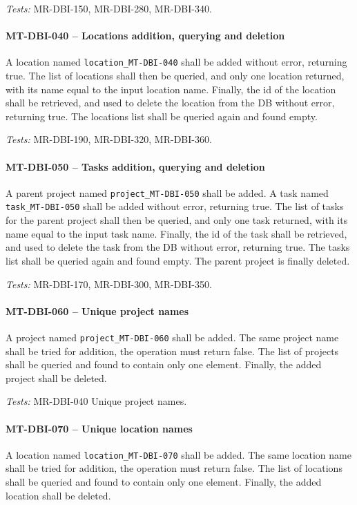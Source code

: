\textit{Tests: } MR-DBI-150, MR-DBI-280, MR-DBI-340.

\paragraph{MT-DBI-040 -- Locations addition, querying and deletion}
A location named \lstinline{location_MT-DBI-040} shall be added without
error, returning true.
The list of locations shall then be queried, and only one
location returned, with its name equal to the input location name.
Finally, the id of the location shall be retrieved, and used to
delete the location from the \gls{DB} without error, returning true.
The locations list shall be queried again and found empty.

\textit{Tests: } MR-DBI-190, MR-DBI-320, MR-DBI-360.

\paragraph{MT-DBI-050 -- Tasks addition, querying and deletion}
A parent project named \lstinline{project_MT-DBI-050} shall be
added.
A task named \lstinline{task_MT-DBI-050} shall be added without
error, returning true.
The list of tasks for the parent project shall then be queried, and only one
task returned, with its name equal to the input task name.
Finally, the id of the task shall be retrieved, and used to
delete the task from the \gls{DB} without error, returning true.
The tasks list shall be queried again and found empty.
The parent project is finally deleted.

\textit{Tests: } MR-DBI-170, MR-DBI-300, MR-DBI-350.

\paragraph{MT-DBI-060 -- Unique project names}
A project named \lstinline{project_MT-DBI-060} shall be added.
The same project name shall be tried for addition, the operation
must return false.
The list of projects shall be queried and found to contain only
one element.
Finally, the added project shall be deleted.

\textit{Tests: } MR-DBI-040 Unique project names.

\paragraph{MT-DBI-070 -- Unique location names}
A location named \lstinline{location_MT-DBI-070} shall be added.
The same location name shall be tried for addition, the
operation must return false.
The list of locations shall be queried and found to contain only
one element.
Finally, the added location shall be deleted.

